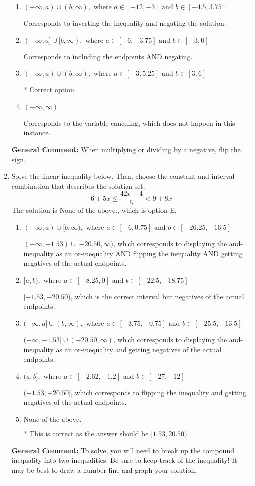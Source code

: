 \documentclass{extbook}[14pt]
\newcommand{\litem}[1]{\item #1

\rule{\textwidth}{0.4pt}}
\begin{document}
\begin{enumerate}
{\begin{enumerate}[label=\Alph*.]
Corresponds to including the endpoints (when they should be excluded).
\item \( (-\infty, a) \cup (b, \infty), \text{ where } a \in [-12, -3] \text{ and } b \in [-4.5, 3.75] \)

Corresponds to inverting the inequality and negating the solution.
\item \( (-\infty, a] \cup [b, \infty), \text{ where } a \in [-6, -3.75] \text{ and } b \in [-3, 0] \)

Corresponds to including the endpoints AND negating.
\item \( (-\infty, a) \cup (b, \infty), \text{ where } a \in [-3, 5.25] \text{ and } b \in [3, 6] \)

 * Correct option.
\item \( (-\infty, \infty) \)

Corresponds to the variable canceling, which does not happen in this instance.
\end{enumerate}

\textbf{General Comment:} When multiplying or dividing by a negative, flip the sign.
}
\litem{
Solve the linear inequality below. Then, choose the constant and interval combination that describes the solution set.
\[ 6 + 5 x \leq \frac{42 x + 4}{5} < 9 + 8 x \]The solution is \( \text{None of the above.} \), which is option E.\begin{enumerate}[label=\Alph*.]
\item \( (-\infty, a) \cup [b, \infty), \text{ where } a \in [-6, 0.75] \text{ and } b \in [-26.25, -16.5] \)

$(-\infty, -1.53) \cup [-20.50, \infty)$, which corresponds to displaying the and-inequality as an or-inequality AND flipping the inequality AND getting negatives of the actual endpoints.
\item \( [a, b), \text{ where } a \in [-8.25, 0] \text{ and } b \in [-22.5, -18.75] \)

$[-1.53, -20.50)$, which is the correct interval but negatives of the actual endpoints.
\item \( (-\infty, a] \cup (b, \infty), \text{ where } a \in [-3.75, -0.75] \text{ and } b \in [-25.5, -13.5] \)

$(-\infty, -1.53] \cup (-20.50, \infty)$, which corresponds to displaying the and-inequality as an or-inequality and getting negatives of the actual endpoints.
\item \( (a, b], \text{ where } a \in [-2.62, -1.2] \text{ and } b \in [-27, -12] \)

$(-1.53, -20.50]$, which corresponds to flipping the inequality and getting negatives of the actual endpoints.
\item \( \text{None of the above.} \)

* This is correct as the answer should be $[1.53, 20.50)$.
\end{enumerate}

\textbf{General Comment:} To solve, you will need to break up the compound inequality into two inequalities. Be sure to keep track of the inequality! It may be best to draw a number line and graph your solution.
}
\end{enumerate}
\end{document}
